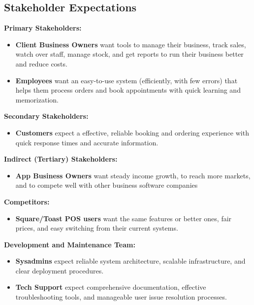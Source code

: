 \documentclass[]{VUMIFTemplateClass}
\begin{document}

\subsection{Stakeholder Expectations}

\textbf{Primary Stakeholders:}
\begin{itemize}
    \item \textbf{Client Business Owners} want tools to manage their business, track sales, watch over staff, manage stock, and get reports to run their business better and reduce costs.
    \item \textbf{Employees} want an easy-to-use system (efficiently, with few errors) that helps them process orders and book appointments with quick learning and memorization.
\end{itemize}

\textbf{Secondary Stakeholders:}
\begin{itemize}
    \item \textbf{Customers} expect a effective, reliable booking and ordering experience with quick response times and accurate information.
\end{itemize}

\textbf{Indirect (Tertiary) Stakeholders:}
\begin{itemize}
    \item \textbf{App Business Owners} want steady income growth, to reach more markets, and to compete well with other business software companies
\end{itemize}

\textbf{Competitors:}
\begin{itemize}
    \item \textbf{Square/Toast POS users} want the same features or better ones, fair prices, and easy switching from their current systems.
\end{itemize}

\textbf{Development and Maintenance Team:}
\begin{itemize}
    \item \textbf{Sysadmins} expect reliable system architecture, scalable infrastructure, and clear deployment procedures.
    \item \textbf{Tech Support} expect comprehensive documentation, effective troubleshooting tools, and manageable user issue resolution processes.
\end{itemize}
\end{document}
